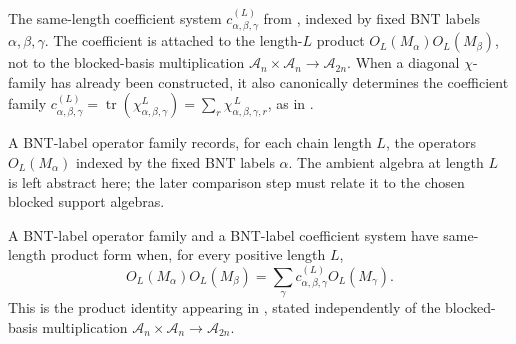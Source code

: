 \begin{definition}%
    \label{def:mpdo_bnt_label_coefficient_family}
    \leanok
    The same-length coefficient system
    $c^{(L)}_{\alpha,\beta,\gamma}$ from \cite[Theorem~4.14(ii)]{Cirac2016MPDO_arXiv}, indexed by
    fixed BNT labels $\alpha,\beta,\gamma$. The coefficient is attached to
    the length-$L$ product
    $O_L(M_\alpha)O_L(M_\beta)$, not to the blocked-basis multiplication
    $\mathcal A_n\times\mathcal A_n\to\mathcal A_{2n}$.
    When a diagonal $\chi$-family has already been constructed, it also
    canonically determines the coefficient family
    $c^{(L)}_{\alpha,\beta,\gamma}
        = \operatorname{tr}(\chi_{\alpha,\beta,\gamma}^{L})
        = \sum_r\chi_{\alpha,\beta,\gamma,r}^{\,L}$, as in
    \cite[Appendix~C.4]{Cirac2016MPDO_arXiv}.
\end{definition}

\begin{definition}%
    \label{def:mpdo_bnt_label_operator_family}
    \leanok
    A BNT-label operator family records, for each chain length $L$, the
    operators $O_L(M_\alpha)$ indexed by the fixed BNT labels $\alpha$.
    The ambient algebra at length $L$ is left abstract here; the later
    comparison step must relate it to the chosen blocked support algebras.
\end{definition}

\begin{definition}%
    \label{def:mpdo_bnt_label_same_length_product_form}
    \leanok
    A BNT-label operator family and a BNT-label coefficient system have
    same-length product form when, for every positive length $L$,
    \[
        O_L(M_\alpha)O_L(M_\beta)
        = \sum_\gamma
        c^{(L)}_{\alpha,\beta,\gamma} O_L(M_\gamma).
    \]
    This is the product identity appearing in \cite[Theorem~4.14(ii)]{Cirac2016MPDO_arXiv}, stated
    independently of the blocked-basis multiplication
    $\mathcal A_n\times\mathcal A_n\to\mathcal A_{2n}$.
\end{definition}

